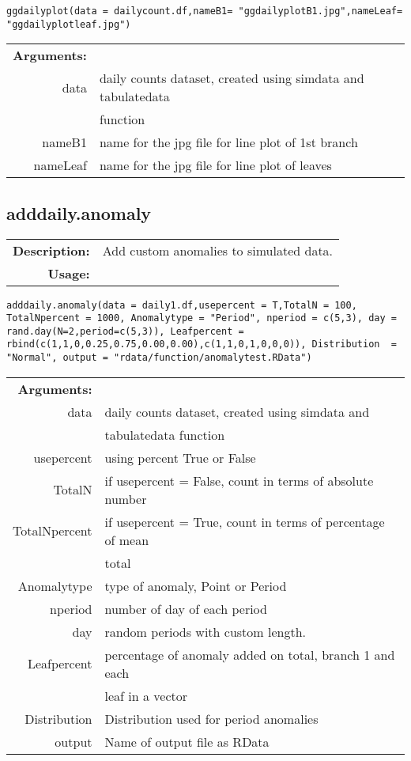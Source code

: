 \begin{lstlisting}
ggdailyplot(data = dailycount.df,nameB1= "ggdailyplotB1.jpg",nameLeaf= "ggdailyplotleaf.jpg")
\end{lstlisting}

\begin{tabular}{rl}
	\textbf{Arguments:} &\\
	data & daily counts dataset, created using simdata and tabulatedata\\
	& function\\
	nameB1 & name for the jpg file for line plot of 1st branch\\
	nameLeaf & name for the jpg file for line plot of leaves\\
\end{tabular}

\newpage%

\subsection{adddaily.anomaly}

\begin{tabular}{rl}
	\textbf{Description:} & Add custom anomalies to simulated data. \\
	\textbf{Usage:} &
\end{tabular}

\begin{lstlisting}
adddaily.anomaly(data = daily1.df,usepercent = T,TotalN = 100, TotalNpercent = 1000, Anomalytype = "Period", nperiod = c(5,3), day = rand.day(N=2,period=c(5,3)), Leafpercent = rbind(c(1,1,0,0.25,0.75,0.00,0.00),c(1,1,0,1,0,0,0)), Distribution  = "Normal", output = "rdata/function/anomalytest.RData")  
\end{lstlisting}

\begin{tabular}{rl}
	\textbf{Arguments:} &\\
	data          & daily counts dataset, created using simdata and \\
	& tabulatedata function\\
	usepercent    & using percent True or False\\
	TotalN        & if usepercent = False, count in terms of absolute number \\
	TotalNpercent & if usepercent = True, count in terms of percentage of mean \\
	& total \\
	Anomalytype   & type of anomaly, Point or Period\\
	nperiod       & number of day of each period\\
	day           & random periods with custom length.\\
	Leafpercent   & percentage of anomaly added on total, branch 1 and each \\
	& leaf in a vector\\
	Distribution  & Distribution used for period anomalies\\
	output          & Name of output file as RData\\
\end{tabular}

